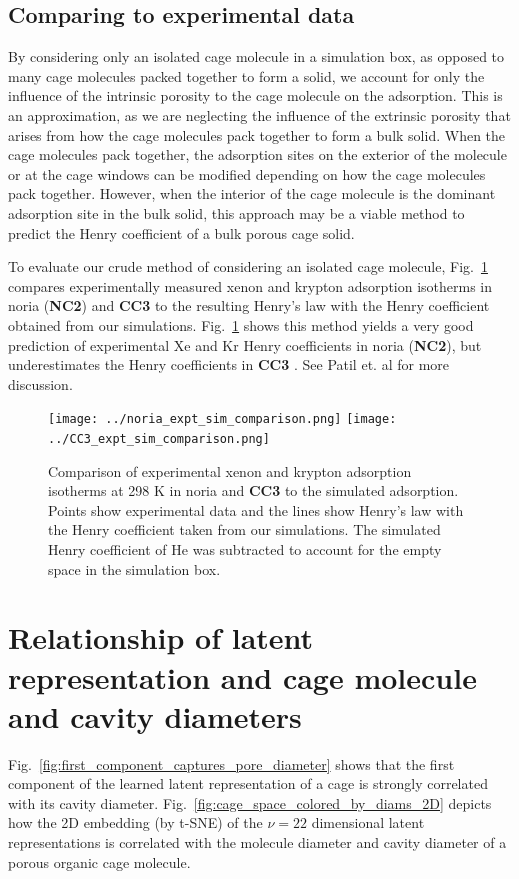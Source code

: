 \documentclass[journal=jacsat,manuscript=article]{achemso}
\begin{document}
\subsection{Comparing to experimental data}
\label{sec:kh_isolated}
By considering only an isolated cage molecule in a simulation box, as opposed to many cage molecules packed together to form a solid, we account for only the influence of the intrinsic porosity to the cage molecule on the adsorption. This is an approximation, as we are neglecting the influence of the extrinsic porosity that arises from how the cage molecules pack together to form a bulk solid. When the cage molecules pack together, the adsorption sites on the exterior of the molecule or at the cage windows can be modified depending on how the cage molecules pack together. However, when the interior of the cage molecule is the dominant adsorption site in the bulk solid, this approach may be a viable method to predict the Henry coefficient of a bulk porous cage solid.

To evaluate our crude method of considering an isolated cage molecule, Fig.~\ref{fig:expt_sim_compare} compares experimentally measured xenon and krypton adsorption isotherms in noria \cite{patil2016noria} (\textbf{NC2}) and \textbf{CC3} \cite{chen2014separation} to the resulting Henry's law with the Henry coefficient obtained from our simulations. Fig.~\ref{fig:expt_sim_compare} shows this method yields a very good prediction of experimental Xe and Kr Henry coefficients in noria \cite{patil2016noria} (\textbf{NC2}), but underestimates the Henry coefficients in \textbf{CC3} \cite{chen2014separation}. See Patil et. al \cite{patil2016noria} for more discussion.

\begin{figure}
\centering
	\texttt{[image: ../noria\_expt\_sim\_comparison.png]}
	\texttt{[image: ../CC3\_expt\_sim\_comparison.png]}
	\caption{Comparison of experimental xenon and krypton adsorption isotherms at 298 K in noria \cite{patil2016noria} and \textbf{CC3} \cite{chen2014separation} to the simulated adsorption. Points show experimental data and the lines show Henry's law with the Henry coefficient taken from our simulations. The simulated Henry coefficient of He was subtracted to account for the empty space in the simulation box.
	} \label{fig:expt_sim_compare}
\end{figure}

\newpage
\clearpage

\section{Relationship of latent representation and cage molecule and cavity diameters}
Fig.~\ref{fig:first_component_captures_pore_diameter} shows that the first component of the learned latent representation of a cage is strongly correlated with its cavity diameter. 
Fig.~\ref{fig:cage_space_colored_by_diams_2D} depicts how the 2D embedding (by t-SNE) of the $\nu=22$ dimensional latent representations is correlated with the molecule diameter and cavity diameter of a porous organic cage molecule.
\end{document}
